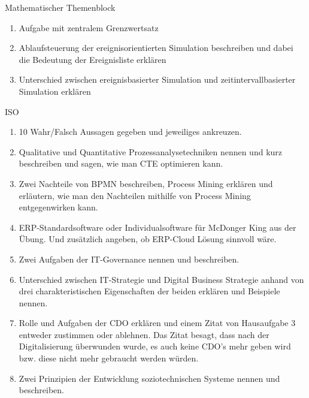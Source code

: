 \documentclass{article}
\begin{document}
\begin{exercise}{Mathematischer Themenblock}
  \begin{enumerate}
    \item Aufgabe mit zentralem Grenzwertsatz
    \item Ablaufsteuerung der ereignisorientierten Simulation beschreiben und dabei die Bedeutung der Ereignisliste erklären
    \item Unterschied zwischen ereignisbasierter Simulation und zeitintervallbasierter Simulation erklären
  \end{enumerate}
\end{exercise}

\begin{exercise}{ISO}
  \begin{enumerate}
    \item 10 Wahr/Falsch Aussagen gegeben und jeweiliges ankreuzen.
    \item Qualitative und Quantitative Prozessanalysetechniken nennen und kurz beschreiben und sagen, wie man CTE optimieren kann.
    \item Zwei Nachteile von BPMN beschreiben, Process Mining erklären und erläutern, wie man den Nachteilen mithilfe von Process Mining entgegenwirken kann.
    \item ERP-Standardsoftware oder Individualsoftware für McDonger King aus der Übung. Und zusätzlich angeben, ob ERP-Cloud Lösung sinnvoll wäre.
    \item Zwei Aufgaben der IT-Governance nennen und beschreiben.
    \item Unterschied zwischen IT-Strategie und Digital Business Strategie anhand von drei charakteristischen Eigenschaften der beiden erklären und Beispiele nennen.
    \item Rolle und Aufgaben der CDO erklären und einem Zitat von Hausaufgabe 3 entweder zustimmen oder ablehnen. Das Zitat besagt, dass nach der Digitalisierung überwunden wurde, es auch keine CDO's mehr geben wird bzw. diese nicht mehr gebraucht werden würden.
    \item Zwei Prinzipien der Entwicklung soziotechnischen Systeme nennen und beschreiben.
  \end{enumerate}
\end{exercise}

\end{document}
